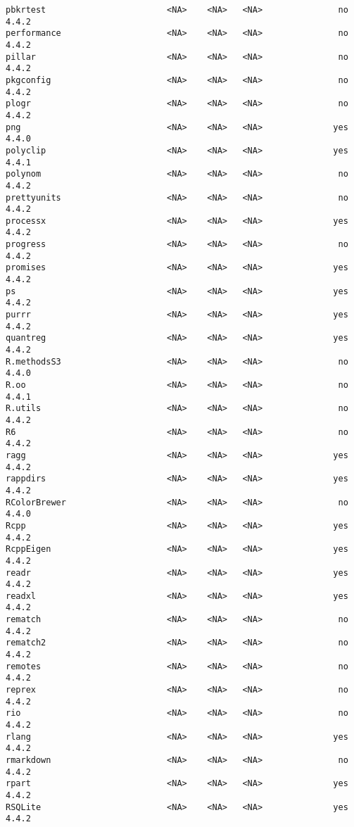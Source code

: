 \documentclass[
  letterpaper,
  DIV=11,
  numbers=noendperiod]{scrreprt}
\begin{document}
\begin{verbatim}
pbkrtest                        <NA>    <NA>   <NA>               no 4.4.2
performance                     <NA>    <NA>   <NA>               no 4.4.2
pillar                          <NA>    <NA>   <NA>               no 4.4.2
pkgconfig                       <NA>    <NA>   <NA>               no 4.4.2
plogr                           <NA>    <NA>   <NA>               no 4.4.2
png                             <NA>    <NA>   <NA>              yes 4.4.0
polyclip                        <NA>    <NA>   <NA>              yes 4.4.1
polynom                         <NA>    <NA>   <NA>               no 4.4.2
prettyunits                     <NA>    <NA>   <NA>               no 4.4.2
processx                        <NA>    <NA>   <NA>              yes 4.4.2
progress                        <NA>    <NA>   <NA>               no 4.4.2
promises                        <NA>    <NA>   <NA>              yes 4.4.2
ps                              <NA>    <NA>   <NA>              yes 4.4.2
purrr                           <NA>    <NA>   <NA>              yes 4.4.2
quantreg                        <NA>    <NA>   <NA>              yes 4.4.2
R.methodsS3                     <NA>    <NA>   <NA>               no 4.4.0
R.oo                            <NA>    <NA>   <NA>               no 4.4.1
R.utils                         <NA>    <NA>   <NA>               no 4.4.2
R6                              <NA>    <NA>   <NA>               no 4.4.2
ragg                            <NA>    <NA>   <NA>              yes 4.4.2
rappdirs                        <NA>    <NA>   <NA>              yes 4.4.2
RColorBrewer                    <NA>    <NA>   <NA>               no 4.4.0
Rcpp                            <NA>    <NA>   <NA>              yes 4.4.2
RcppEigen                       <NA>    <NA>   <NA>              yes 4.4.2
readr                           <NA>    <NA>   <NA>              yes 4.4.2
readxl                          <NA>    <NA>   <NA>              yes 4.4.2
rematch                         <NA>    <NA>   <NA>               no 4.4.2
rematch2                        <NA>    <NA>   <NA>               no 4.4.2
remotes                         <NA>    <NA>   <NA>               no 4.4.2
reprex                          <NA>    <NA>   <NA>               no 4.4.2
rio                             <NA>    <NA>   <NA>               no 4.4.2
rlang                           <NA>    <NA>   <NA>              yes 4.4.2
rmarkdown                       <NA>    <NA>   <NA>               no 4.4.2
rpart                           <NA>    <NA>   <NA>              yes 4.4.2
RSQLite                         <NA>    <NA>   <NA>              yes 4.4.2

\end{verbatim}
\end{document}
